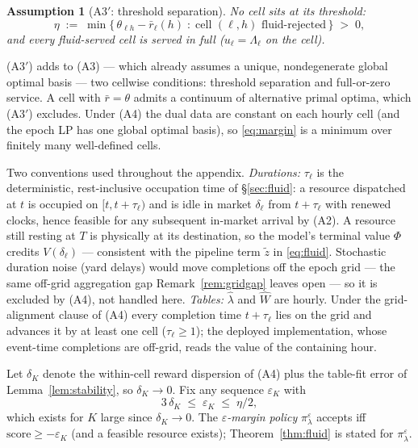 \documentclass[11pt]{article}
\newtheorem{assumption}{Assumption}
\newcommand{\pol}{\pi_{\lambda}}
\begin{document}
\begin{assumption}[A3$'$: threshold separation]
\label{ass:sep}
No cell sits at its threshold:
\begin{equation}
  \eta \;:=\; \min \bigl\{\, \theta_{\ell h} - \bar{r}_{\ell}(h)
  \;:\; \text{cell } (\ell, h) \text{ fluid-rejected} \,\bigr\}
  \;>\; 0,
  \label{eq:margin}
\end{equation}
and every fluid-served cell is served in full
($u_{\ell} = \Lambda_{\ell}$ on the cell).
\end{assumption}

(A3$'$) adds to (A3) --- which already assumes a unique,
nondegenerate global optimal basis --- two cellwise conditions:
threshold separation and full-or-zero service. A cell with
$\bar{r} = \theta$ admits a continuum of alternative primal optima,
which (A3$'$) excludes. Under (A4) the dual data are constant on each
hourly cell (and the epoch LP has one global optimal basis), so
\eqref{eq:margin} is a minimum over finitely many well-defined cells.

Two conventions used throughout the appendix. \emph{Durations:}
$\tau_{\ell}$ is the deterministic, rest-inclusive occupation time of
\S\ref{sec:fluid}: a resource dispatched at $t$ is occupied on
$[t, t + \tau_{\ell})$ and is idle in market $\delta_{\ell}$ from
$t + \tau_{\ell}$ with renewed clocks, hence feasible for any
subsequent in-market arrival by (A2). A resource still resting at $T$
is physically at its destination, so the model's terminal value
$\Phi$ credits $V(\delta_{\ell})$ --- consistent with the pipeline
term $\tilde{z}$ in \eqref{eq:fluid}. Stochastic duration noise
(yard delays) would move completions off the epoch grid --- the same
off-grid aggregation gap Remark~\ref{rem:gridgap} leaves open --- so
it is excluded by (A4), not handled here. \emph{Tables:} $\hat{\lambda}$ and $\widehat{W}$ are hourly.
Under the grid-alignment clause of (A4) every completion time
$t + \tau_{\ell}$ lies on the grid and advances it by at least one
cell ($\tau_{\ell} \geq 1$); the deployed implementation, whose
event-time completions are off-grid, reads the value of the containing
hour.

Let $\delta_K$ denote the within-cell reward dispersion of (A4) plus
the table-fit error of Lemma~\ref{lem:stability}, so
$\delta_K \to 0$. Fix any sequence $\varepsilon_K$ with
\begin{equation}
  3\,\delta_K \;\leq\; \varepsilon_K \;\leq\; \eta / 2,
  \label{eq:margincond}
\end{equation}
which exists for $K$ large since $\delta_K \to 0$. The
\emph{$\varepsilon$-margin policy} $\pol^{\varepsilon}$ accepts iff
$\mathrm{score} \geq -\varepsilon_K$ (and a feasible resource exists);
Theorem~\ref{thm:fluid} is stated for $\pol^{\varepsilon}$.
\end{document}
